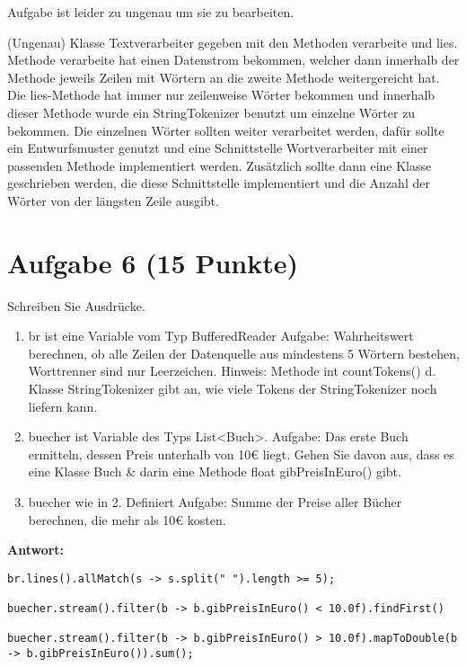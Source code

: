 Aufgabe ist leider zu ungenau um sie zu bearbeiten.

(Ungenau) Klasse Textverarbeiter gegeben mit den Methoden verarbeite und lies.
Methode verarbeite hat einen Datenstrom bekommen, welcher dann innerhalb der Methode jeweils
Zeilen mit Wörtern an die zweite Methode weitergereicht hat. Die lies-Methode hat immer nur
zeilenweise Wörter bekommen und innerhalb dieser Methode wurde ein StringTokenizer benutzt um
einzelne Wörter zu bekommen. Die einzelnen Wörter sollten weiter verarbeitet werden, dafür sollte
ein Entwurfsmuster genutzt und eine Schnittstelle Wortverarbeiter mit einer passenden Methode
implementiert werden. Zusätzlich sollte dann eine Klasse geschrieben werden, die diese Schnittstelle
implementiert und die Anzahl der Wörter von der längsten Zeile ausgibt.

\section{Aufgabe 6 (15 Punkte)}

Schreiben Sie Ausdrücke.

\begin{enumerate}
    \item br ist eine Variable vom Typ BufferedReader Aufgabe: Wahrheitswert berechnen,
          ob alle Zeilen der Datenquelle aus mindestens 5 Wörtern bestehen, Worttrenner
          sind nur Leerzeichen. Hinweis: Methode int countTokens() d. Klasse
          StringTokenizer gibt an, wie viele Tokens der StringTokenizer noch liefern
          kann.
    \item buecher ist Variable des Typs List<Buch>. Aufgabe: Das erste Buch ermitteln,
          dessen Preis unterhalb von 10€ liegt. Gehen Sie davon aus, dass es eine Klasse
          Buch \& darin eine Methode float gibPreisInEuro() gibt.
    \item buecher wie in 2. Definiert Aufgabe: Summe der Preise aller Bücher berechnen,
          die mehr als 10€ kosten.
\end{enumerate}

\textbf{Antwort:}

\begin{lstlisting}
br.lines().allMatch(s -> s.split(" ").length >= 5);

buecher.stream().filter(b -> b.gibPreisInEuro() < 10.0f).findFirst()

buecher.stream().filter(b -> b.gibPreisInEuro() > 10.0f).mapToDouble(b -> b.gibPreisInEuro()).sum();
\end{lstlisting}

